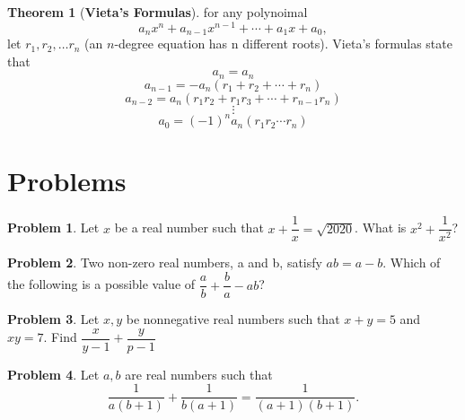 \documentclass[a4paper]{article}
\theoremstyle{definition}
\newtheorem{theorem}{Theorem}
\newtheorem{problem}{Problem}
\begin{document}
\begin{theorem}[\textbf{Vieta’s Formulas}]
    for any polynoimal
    \[
        a_n x^n + a_{n-1} x^{n-1} + \cdots + a_1 x + a_0 ,
    \]
    let \(r_1, r_2, \dots r_n\) (an \(n\)-degree equation has n different roots).
    Vieta’s formulas state that
    \[
        a_n = a_n
    \]
    \[
        a_{n-1} = -a_n(r_1 + r_2 + \cdots + r_n)
    \]
    \[
        a_{n-2} = a_n(r_1r_2+r_1r_3+\cdots + r_{n-1}r_n)
    \]
    \[
        \vdots
    \]
    \[
        a_0 = (-1)^n a_n(r_1r_2\cdots r_n)
    \]
\end{theorem}

\section{Problems}
\begin{problem}
Let \(x\) be a real number such that \(x+\dfrac{1}{x} = \sqrt{2020}\).
What is \(x^2 + \dfrac{1}{x^2}\)?
\end{problem}
\begin{problem}
Two non-zero real numbers, a and b, satisfy \(ab = a - b\).
Which of the following is a possible value of \(\dfrac{a}{b}
+ \dfrac{b}{a} -ab \)?
\end{problem}
\begin{problem}
Let \(x, y\) be nonnegative real numbers such that \(x + y = 5\) and \(xy = 7\). Find
\(\dfrac{x}{y-1} +\dfrac{y}{p-1}\)
\end{problem}
\begin{problem}
Let \(a, b\) are real numbers such that
\[
    \dfrac{1}{a(b+1)} + \dfrac{1}{b(a+1)} = \dfrac{1}{(a+1)(b+1)}.
\]

\end{problem}
\end{document}
